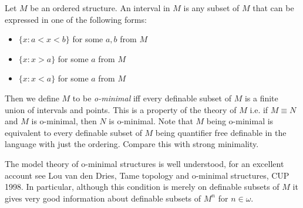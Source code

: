 \documentclass[12pt]{article}
\begin{document}
Let $M$ be an ordered structure. An interval in $M$ is any subset of $M$ that can be expressed in one of the following forms:
 \begin{itemize} \item $\{x:a<x<b\}$ for some $a,b$ from $M$
\item $\{x:x>a\}$ for some $a$ from $M$
\item $\{x:x<a\}$ for some $a$ from $M$
\end{itemize}

Then we define $M$ to be {\em o-minimal} iff every definable subset of $M$ is a finite union of intervals and points. This is a property of the theory of $M$ i.e. if $M \equiv N$ and $M$ is o-minimal, then $N$ is o-minimal. 
Note that $M$ being o-minimal is equivalent to every definable subset of $M$ being quantifier free definable in the language with just the ordering. Compare this with strong minimality.

\medskip

The model theory of o-minimal structures is well understood, for an excellent account see Lou van den Dries, Tame topology and o-minimal structures, CUP 1998.
In particular, although this condition is merely on definable subsets of $M$ it gives very good information about definable subsets of $M^{n}$ for $n \in \omega$.
\end{document}
